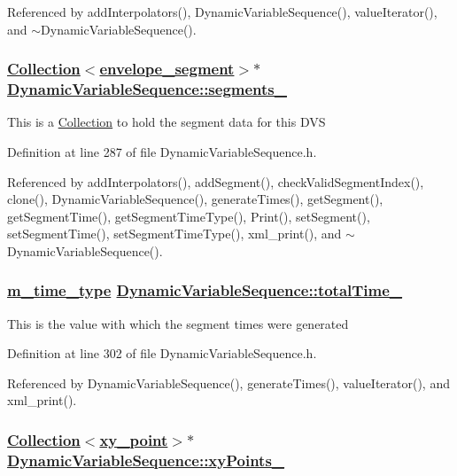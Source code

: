 Referenced by add\-Interpolators(), Dynamic\-Variable\-Sequence(), value\-Iterator(), and $\sim$Dynamic\-Variable\-Sequence().\hypertarget{classDynamicVariableSequence_r1}{
\subsubsection[segments\_\-]{\setlength{\rightskip}{0pt plus 5cm}\hyperlink{classCollection}{Collection}$<$\hyperlink{structenvelope__segment}{envelope\_\-segment}$>$$\ast$ \hyperlink{classDynamicVariableSequence_r1}{Dynamic\-Variable\-Sequence::segments\_\-}}}
\label{classDynamicVariableSequence_r1}


This is a \hyperlink{classCollection}{Collection} to hold the segment data for this DVS 

Definition at line 287 of file Dynamic\-Variable\-Sequence.h.

Referenced by add\-Interpolators(), add\-Segment(), check\-Valid\-Segment\-Index(), clone(), Dynamic\-Variable\-Sequence(), generate\-Times(), get\-Segment(), get\-Segment\-Time(), get\-Segment\-Time\-Type(), Print(), set\-Segment(), set\-Segment\-Time(), set\-Segment\-Time\-Type(), xml\_\-print(), and $\sim$Dynamic\-Variable\-Sequence().\hypertarget{classDynamicVariableSequence_r4}{
\subsubsection[totalTime\_\-]{\setlength{\rightskip}{0pt plus 5cm}\hyperlink{Types_8h_a2}{m\_\-time\_\-type} \hyperlink{classDynamicVariableSequence_r4}{Dynamic\-Variable\-Sequence::total\-Time\_\-}}}
\label{classDynamicVariableSequence_r4}


This is the value with which the segment times were generated 

Definition at line 302 of file Dynamic\-Variable\-Sequence.h.

Referenced by Dynamic\-Variable\-Sequence(), generate\-Times(), value\-Iterator(), and xml\_\-print().\hypertarget{classDynamicVariableSequence_r0}{
\subsubsection[xyPoints\_\-]{\setlength{\rightskip}{0pt plus 5cm}\hyperlink{classCollection}{Collection}$<$\hyperlink{structxy__point}{xy\_\-point}$>$$\ast$ \hyperlink{classDynamicVariableSequence_r0}{Dynamic\-Variable\-Sequence::xy\-Points\_\-}}}
\label{classDynamicVariableSequence_r0}



